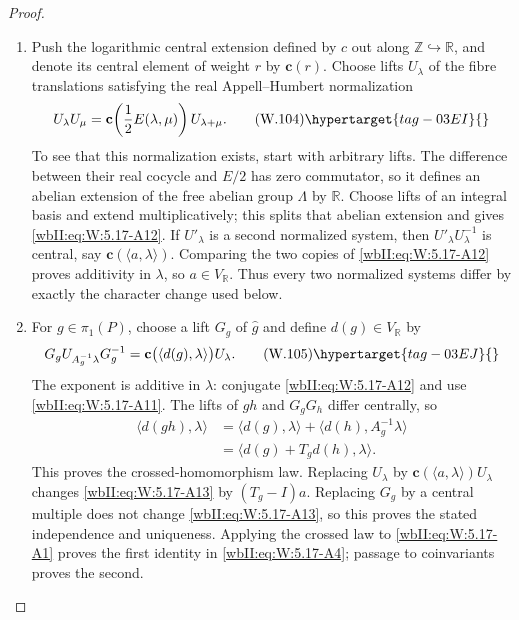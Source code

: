 \begin{proof}
\begin{enumerate}[label={$\langle1\rangle$\arabic*.},leftmargin=*]
\item Push the logarithmic central extension defined by \(c\) out along
\(\mathbb Z\hookrightarrow\mathbb R\), and denote its central element of
weight \(r\) by \(\mathbf c(r)\).  Choose lifts \(U_\lambda\) of the fibre
translations satisfying the real Appell--Humbert normalization
\[
 U_\lambda U_\mu
 =\mathbf c\!\left(\frac12E(\lambda,\mu)\right)U_{\lambda+\mu}.
\tag{W.104}\hypertarget{tag-03EI}{}\label{wbII:eq:W:5.17-A12}
\]
To see that this normalization exists, start with arbitrary lifts.  The
difference between their real cocycle and \(E/2\) has zero commutator, so
it defines an abelian extension of the free abelian group \(\Lambda\) by
\(\mathbb R\).  Choose lifts of an integral basis and extend
multiplicatively; this splits that abelian extension and gives \eqref{wbII:eq:W:5.17-A12}.
If \(U'_\lambda\) is a second normalized system, then
\(U'_\lambda U_\lambda^{-1}\) is central, say
\(\mathbf c(\langle a,\lambda\rangle)\).  Comparing the two copies of
\eqref{wbII:eq:W:5.17-A12} proves additivity in \(\lambda\), so
\(a\in V_{\mathbb R}\).  Thus every two normalized systems differ by exactly
the character change used below.

\item For \(g\in\pi_1(P)\), choose a lift \(G_g\) of \(\widehat g\) and define
\(d(g)\in V_{\mathbb R}\) by
\[
 G_gU_{A_g^{-1}\lambda}G_g^{-1}
 =\mathbf c\bigl(\langle d(g),\lambda\rangle\bigr)U_\lambda.
\tag{W.105}\hypertarget{tag-03EJ}{}\label{wbII:eq:W:5.17-A13}
\]
The exponent is additive in \(\lambda\): conjugate \eqref{wbII:eq:W:5.17-A12} and use
\eqref{wbII:eq:W:5.17-A11}.  The lifts of \(gh\) and \(G_gG_h\) differ centrally, so
\[
\begin{aligned}
 \langle d(gh),\lambda\rangle
 &=\langle d(g),\lambda\rangle
   +\langle d(h),A_g^{-1}\lambda\rangle\\
 &=\langle d(g)+T_gd(h),\lambda\rangle.
\end{aligned}
\]
This proves the crossed-homomorphism law.  Replacing
\(U_\lambda\) by
\(\mathbf c(\langle a,\lambda\rangle)U_\lambda\) changes \eqref{wbII:eq:W:5.17-A13} by
\((T_g-I)a\).  Replacing \(G_g\) by a central multiple does not change
\eqref{wbII:eq:W:5.17-A13}, so this proves the stated independence and uniqueness.  Applying
the crossed law to
\eqref{wbII:eq:W:5.17-A1} proves the first identity in \eqref{wbII:eq:W:5.17-A4}; passage to coinvariants
proves the second.


\end{enumerate}
\end{proof}
